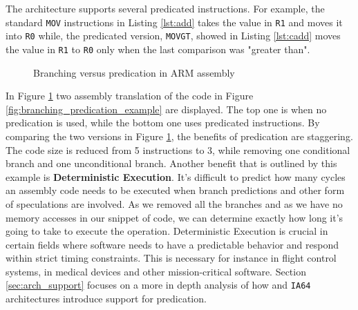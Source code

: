 The \armvs architecture supports several predicated instructions. For example, the standard \texttt{MOV} instructions in Listing \ref{lst:add} takes the value in \texttt{R1} and moves it into \texttt{R0} while, the predicated version, \texttt{MOVGT}, showed in Listing \ref{lst:cadd} moves the value in \texttt{R1} to \texttt{R0} only when the last comparison was "greater than". \\

\begin{figure}[h!]
\centering

\caption{Branching versus predication in ARM assembly}
\label{fig:branching_predication_ARM}
\end{figure}

In Figure \ref{fig:branching_predication_ARM} two assembly translation of the code in Figure \ref{fig:branching_predication_example} are displayed. The top one is when no predication is used, while the bottom one uses predicated instructions.
By comparing the two versions in Figure \ref{fig:branching_predication_ARM}, the benefits of predication are staggering. The code size is reduced from 5 instructions to 3, while removing one conditional branch and one unconditional branch. Another benefit that is outlined by this example is \textbf{Deterministic Execution}. It's difficult to predict how many cycles an assembly code needs to be executed when branch predictions and other form of speculations are involved. As we removed all the branches and as we have no memory accesses in our snippet of code, we can determine exactly how long it's going to take to execute the operation. Deterministic Execution is crucial in certain fields where software needs to have a predictable behavior and respond within strict timing constraints. This is necessary for instance in flight control systems, in medical devices and other mission-critical software.
Section \ref{sec:arch_support} focuses on a more in depth analysis of how \armvs and \texttt{IA64} architectures introduce support for predication.


